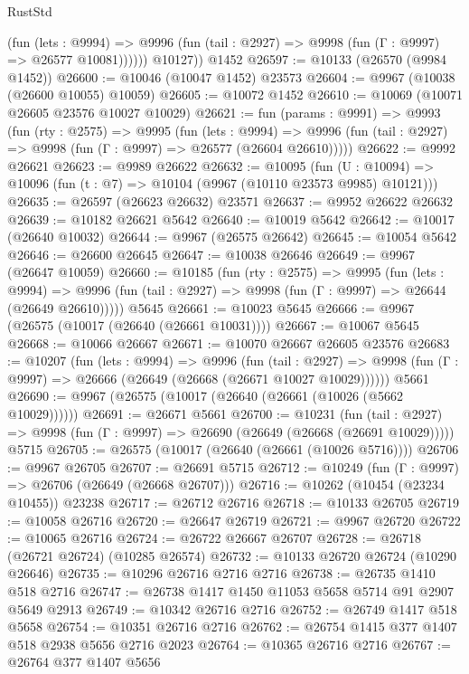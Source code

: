 \begin{lexlean}{RustStd}
\begin{coremodule}
              (fun (lets : @9994) =>
              @9996 (fun (tail : @2927) => @9998 (fun (Γ : @9997) => @26577 @10081))))))
        @10127))
    @1452
@26597 := @10133 (@26570 (@9984 @1452))
@26600 := @10046 (@10047 @1452) @23573
@26604 := @9967 (@10038 (@26600 @10055) @10059)
@26605 := @10072 @1452
@26610 := @10069 (@10071 @26605 @23576 @10027 @10029)
@26621 := fun (params : @9991) =>
  @9993
    (fun (rty : @2575) =>
    @9995
      (fun (lets : @9994) =>
      @9996 (fun (tail : @2927) => @9998 (fun (Γ : @9997) => @26577 (@26604 @26610)))))
@26622 := @9992 @26621
@26623 := @9989 @26622
@26632 := @10095
    (fun (U : @10094) => @10096 (fun (t : @7) => @10104 (@9967 (@10110 @23573 @9985) @10121)))
@26635 := @26597 (@26623 @26632) @23571
@26637 := @9952 @26622 @26632
@26639 := @10182 @26621 @5642
@26640 := @10019 @5642
@26642 := @10017 (@26640 @10032)
@26644 := @9967 (@26575 @26642)
@26645 := @10054 @5642
@26646 := @26600 @26645
@26647 := @10038 @26646
@26649 := @9967 (@26647 @10059)
@26660 := @10185
    (fun (rty : @2575) =>
    @9995
      (fun (lets : @9994) =>
      @9996 (fun (tail : @2927) => @9998 (fun (Γ : @9997) => @26644 (@26649 @26610)))))
    @5645
@26661 := @10023 @5645
@26666 := @9967 (@26575 (@10017 (@26640 (@26661 @10031))))
@26667 := @10067 @5645
@26668 := @10066 @26667
@26671 := @10070 @26667 @26605 @23576
@26683 := @10207
    (fun (lets : @9994) =>
    @9996
      (fun (tail : @2927) =>
      @9998 (fun (Γ : @9997) => @26666 (@26649 (@26668 (@26671 @10027 @10029))))))
    @5661
@26690 := @9967 (@26575 (@10017 (@26640 (@26661 (@10026 (@5662 @10029))))))
@26691 := @26671 @5661
@26700 := @10231
    (fun (tail : @2927) => @9998 (fun (Γ : @9997) => @26690 (@26649 (@26668 (@26691 @10029)))))
    @5715
@26705 := @26575 (@10017 (@26640 (@26661 (@10026 @5716))))
@26706 := @9967 @26705
@26707 := @26691 @5715
@26712 := @10249 (fun (Γ : @9997) => @26706 (@26649 (@26668 @26707)))
@26716 := @10262 (@10454 (@23234 @10455)) @23238
@26717 := @26712 @26716
@26718 := @10133 @26705
@26719 := @10058 @26716
@26720 := @26647 @26719
@26721 := @9967 @26720
@26722 := @10065 @26716
@26724 := @26722 @26667 @26707
@26728 := @26718 (@26721 @26724) (@10285 @26574)
@26732 := @10133 @26720 @26724 (@10290 @26646)
@26735 := @10296 @26716 @2716 @2716
@26738 := @26735 @1410 @518 @2716
@26747 := @26738 @1417 @1450 @11053 @5658 @5714 @91 @2907 @5649 @2913
@26749 := @10342 @26716 @2716
@26752 := @26749 @1417 @518 @5658
@26754 := @10351 @26716 @2716
@26762 := @26754 @1415 @377 @1407 @518 @2938 @5656 @2716 @2023
@26764 := @10365 @26716 @2716
@26767 := @26764 @377 @1407 @5656

\end{coremodule}
\end{lexlean}
